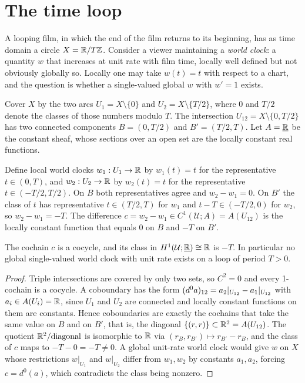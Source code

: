 \section{The time loop}

A looping film, in which the end of the film returns to its beginning, has as time domain a circle $X=\mathbb{R}/T\mathbb{Z}$. Consider a viewer maintaining a \emph{world clock}: a quantity $w$ that increases at unit rate with film time, locally well defined but not obviously globally so. Locally one may take $w(t)=t$ with respect to a chart, and the question is whether a single-valued global $w$ with $w'=1$ exists.

Cover $X$ by the two arcs $U_1=X\setminus\{0\}$ and $U_2=X\setminus\{T/2\}$, where $0$ and $T/2$ denote the classes of those numbers modulo $T$. The intersection $U_{12}=X\setminus\{0,T/2\}$ has two connected components $B=(0,T/2)$ and $B'=(T/2,T)$. Let $A=\underline{\mathbb{R}}$ be the constant sheaf, whose sections over an open set are the locally constant real functions.

Define local world clocks $w_1:U_1\to\mathbb{R}$ by $w_1(t)=t$ for the representative $t\in(0,T)$, and $w_2:U_2\to\mathbb{R}$ by $w_2(t)=t$ for the representative $t\in(-T/2,T/2)$. On $B$ both representatives agree and $w_2-w_1=0$. On $B'$ the class of $t$ has representative $t\in(T/2,T)$ for $w_1$ and $t-T\in(-T/2,0)$ for $w_2$, so $w_2-w_1=-T$. The difference $c=w_2-w_1\in C^1(\mathcal{U};A)=A(U_{12})$ is the locally constant function that equals $0$ on $B$ and $-T$ on $B'$.

\begin{proposition}\label{prop:loop}
The cochain $c$ is a cocycle, and its class in $H^1(\mathcal{U};\underline{\mathbb{R}})\cong\mathbb{R}$ is $-T$. In particular no global single-valued world clock with unit rate exists on a loop of period $T>0$.
\end{proposition}

\begin{proof}
Triple intersections are covered by only two sets, so $C^2=0$ and every 1-cochain is a cocycle. A coboundary has the form $(d^0a)_{12}=a_2|_{U_{12}}-a_1|_{U_{12}}$ with $a_i\in A(U_i)=\mathbb{R}$, since $U_1$ and $U_2$ are connected and locally constant functions on them are constants. Hence coboundaries are exactly the cochains that take the same value on $B$ and on $B'$, that is, the diagonal $\{(r,r)\}\subset\mathbb{R}^2=A(U_{12})$. The quotient $\mathbb{R}^2/\text{diagonal}$ is isomorphic to $\mathbb{R}$ via $(r_B,r_{B'})\mapsto r_{B'}-r_B$, and the class of $c$ maps to $-T-0=-T\neq0$. A global unit-rate world clock would give $w$ on $X$ whose restrictions $w|_{U_1}$ and $w|_{U_2}$ differ from $w_1,w_2$ by constants $a_1,a_2$, forcing $c=d^0(a)$, which contradicts the class being nonzero.
\end{proof}


